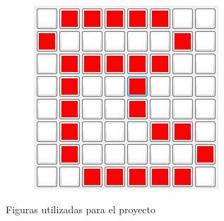 \documentclass[12pt, oneside]{article}
\begin{document}
\begin{figure}[h!]
\begin{subfigure}{0.45\textwidth}
    \end{subfigure}
    \begin{subfigure}{0.45\linewidth}
        \centering
        \includegraphics[width=\linewidth]{figs/bota.PNG}
    \end{subfigure}

    \caption{\sffamily Figuras utilizadas para el proyecto}
    \label{fig:figuras}
\end{figure}

\newpage
\end{document}
